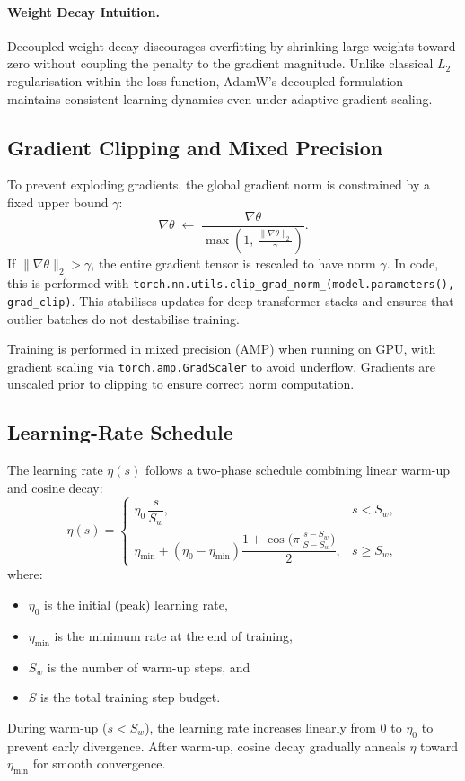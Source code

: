 \documentclass[11pt]{article}
\begin{document}
\paragraph{Weight Decay Intuition.}
Decoupled weight decay discourages overfitting by shrinking large weights
toward zero without coupling the penalty to the gradient magnitude.
Unlike classical $L_2$ regularisation within the loss function,
AdamW’s decoupled formulation maintains consistent learning dynamics
even under adaptive gradient scaling.

\subsection{Gradient Clipping and Mixed Precision}

To prevent exploding gradients, the global gradient norm is constrained by
a fixed upper bound $\gamma$:
\[
\nabla\theta \;\leftarrow\;
\frac{\nabla\theta}{\max\!\left(1,\,
\frac{\|\nabla\theta\|_2}{\gamma}\right)}.
\]
If $\|\nabla\theta\|_2 > \gamma$, the entire gradient tensor is rescaled
to have norm $\gamma$.
In code, this is performed with
\texttt{torch.nn.utils.clip\_grad\_norm\_(model.parameters(), grad\_clip)}.
This stabilises updates for deep transformer stacks
and ensures that outlier batches do not destabilise training.

Training is performed in mixed precision (AMP) when running on GPU,
with gradient scaling via \texttt{torch.amp.GradScaler} to avoid underflow.
Gradients are unscaled prior to clipping to ensure correct norm computation.

\subsection{Learning-Rate Schedule}

The learning rate $\eta(s)$ follows a two-phase schedule combining linear
warm-up and cosine decay:
\[
\eta(s) =
\begin{cases}
\eta_0\,\dfrac{s}{S_w}, & s < S_w,\\[6pt]
\eta_{\min}
+ (\eta_0 - \eta_{\min})
\dfrac{1 + \cos\!\big(\pi\,\tfrac{s - S_w}{S - S_w}\big)}{2},
& s \ge S_w,
\end{cases}
\]
where:
\begin{itemize}
    \item $\eta_0$ is the initial (peak) learning rate,
    \item $\eta_{\min}$ is the minimum rate at the end of training,
    \item $S_w$ is the number of warm-up steps, and
    \item $S$ is the total training step budget.
\end{itemize}
During warm-up ($s<S_w$), the learning rate increases linearly from $0$ to $\eta_0$
to prevent early divergence.
After warm-up, cosine decay gradually anneals $\eta$ toward $\eta_{\min}$
for smooth convergence.
\end{document}
